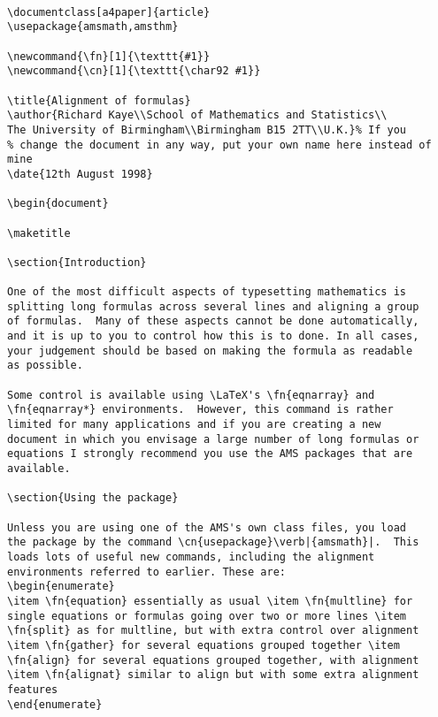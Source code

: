 \documentclass[a4paper]{article}
\newcommand{\fn}[1]{\texttt{#1}}
\newcommand{\cn}[1]{\texttt{\char92 #1}}
\begin{document}
\begin{verbatim}

\documentclass[a4paper]{article}
\usepackage{amsmath,amsthm}

\newcommand{\fn}[1]{\texttt{#1}}
\newcommand{\cn}[1]{\texttt{\char92 #1}}

\title{Alignment of formulas}
\author{Richard Kaye\\School of Mathematics and Statistics\\
The University of Birmingham\\Birmingham B15 2TT\\U.K.}% If you
% change the document in any way, put your own name here instead of mine
\date{12th August 1998}

\begin{document}

\maketitle

\section{Introduction}

One of the most difficult aspects of typesetting mathematics is
splitting long formulas across several lines and aligning a group
of formulas.  Many of these aspects cannot be done automatically,
and it is up to you to control how this is to done. In all cases,
your judgement should be based on making the formula as readable
as possible.

Some control is available using \LaTeX's \fn{eqnarray} and
\fn{eqnarray*} environments.  However, this command is rather
limited for many applications and if you are creating a new
document in which you envisage a large number of long formulas or
equations I strongly recommend you use the AMS packages that are
available.

\section{Using the package}

Unless you are using one of the AMS's own class files, you load
the package by the command \cn{usepackage}\verb|{amsmath}|.  This
loads lots of useful new commands, including the alignment
environments referred to earlier. These are:
\begin{enumerate}
\item \fn{equation} essentially as usual \item \fn{multline} for
single equations or formulas going over two or more lines \item
\fn{split} as for multline, but with extra control over alignment
\item \fn{gather} for several equations grouped together \item
\fn{align} for several equations grouped together, with alignment
\item \fn{alignat} similar to align but with some extra alignment
features
\end{enumerate}


\end{verbatim}
\end{document}

